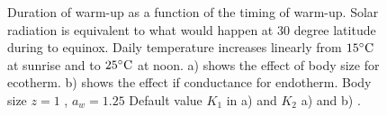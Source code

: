 %
\begin{figure}[H]
\begin{center}
\caption{
	Duration of warm-up as a function of the timing of warm-up.
	Solar radiation is equivalent to what would happen at 30 degree latitude during to equinox.
	Daily temperature increases  linearly from $15^{\circ}\rm{C}$ at sunrise and to $25^{\circ}\rm{C}$ at noon.
	a) shows the effect of body size for ecotherm.
	b)  shows the effect if conductance for endotherm. Body size $z = 1$ , $a_w = 1.25$
	Default value $K_1$ in a) and $K_2$ a) and b) .	
}%
\label{fig5}
\end{center}
\end{figure}
\vspace{-0.8cm}
